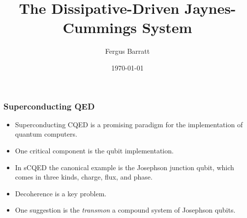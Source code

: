 \documentclass{beamer}
\title{The Dissipative-Driven Jaynes-Cummings System}
\date{\today}
\author{Fergus Barratt}
\begin{document}
\maketitle

\begin{frame}

    \frametitle{Superconducting QED}         

    \begin{itemize}
        \item Superconducting CQED is a promising paradigm for the implementation of quantum computers. 
        \item One critical component is the qubit implementation.
        \item In sCQED the canonical example is the Josephson junction qubit, which comes in three kinds, charge, flux, and phase. 
        \item Decoherence is a key problem.
        \item One suggestion is the \emph{transmon} a compound system of Josephson qubits.
    \end{itemize}

\end{frame}
\end{document}
